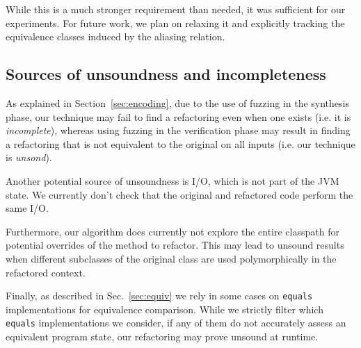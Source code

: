 \documentclass[sigconf,review,anonymous]{acmart}
\begin{document}
While this is a much stronger requirement than needed, it was sufficient for our experiments.
For future work, we plan on relaxing it and explicitly tracking the equivalence classes induced by the aliasing
relation.




\subsection{Sources of unsoundness and incompleteness}
As explained in Section~\ref{sec:encoding}, due to the use of fuzzing in the synthesis
phase, our technique may fail to find a refactoring even when one
exists (i.e. it is {\em incomplete}), whereas using fuzzing in the verification phase may result in finding a refactoring that is not equivalent to the original on all
inputs (i.e. our technique is {\em unsond}).

Another potential source of unsoundness is I/O,
which is not part of the JVM state. We currently don't check
that the original and refactored code perform the same I/O.

Furthermore, our algorithm does currently not explore the entire classpath for
potential overrides of the method to refactor. This may lead to unsound results
when different subclasses of the original class are used polymorphically in the
refactored context.

Finally, as described in Sec.~\ref{sec:equiv} we rely in some cases on \texttt{equals}
implementations for equivalence comparison. While we strictly filter which \texttt{equals}
implementations we consider, if any of them do not accurately assess an equivalent program state, 
our refactoring may prove unsound at runtime.
\end{document}
